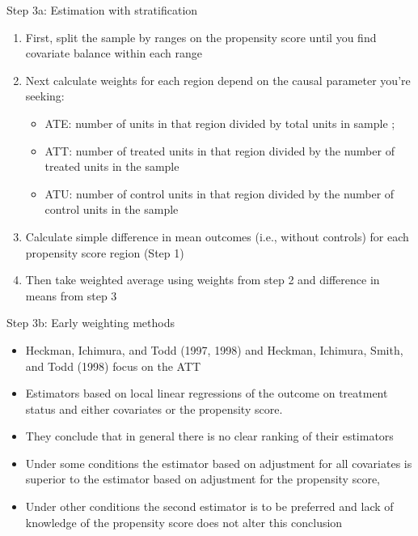 \documentclass{beamer}
\begin{document}
\begin{frame}{Step 3a: Estimation with stratification}

\begin{enumerate}
	\item First, split the sample by ranges on the propensity score until you find covariate balance within each range
	\item Next calculate weights for each region depend on the causal parameter you're seeking:
		\begin{itemize}
		\item ATE: number of units in that region divided by total units in sample ;
		\item ATT: number of treated units in that region divided by the number of treated units in the sample
		\item ATU: number of control units in that region divided by the number of control units in the sample
		\end{itemize}
	\item Calculate simple difference in mean outcomes (i.e., without controls) for each propensity score region (Step 1)
	\item Then take weighted average using weights from step 2 and difference in means from step 3
\end{enumerate}

\end{frame}




\begin{frame}{Step 3b: Early weighting methods}

\begin{itemize} 
\item Heckman, Ichimura, and Todd (1997, 1998) and Heckman, Ichimura, Smith,
and Todd (1998) focus on the ATT
\item Estimators based on local linear regressions of the outcome on treatment status and either covariates or the propensity score. 
\item They conclude that in general there is no clear ranking of their estimators 
\item Under some conditions the estimator based on adjustment for all covariates is superior to the estimator based on adjustment for the propensity score, \item Under other conditions the second estimator is to be preferred and lack of knowledge of the propensity score does not alter this conclusion
\end{itemize}

\end{frame}
\end{document}
